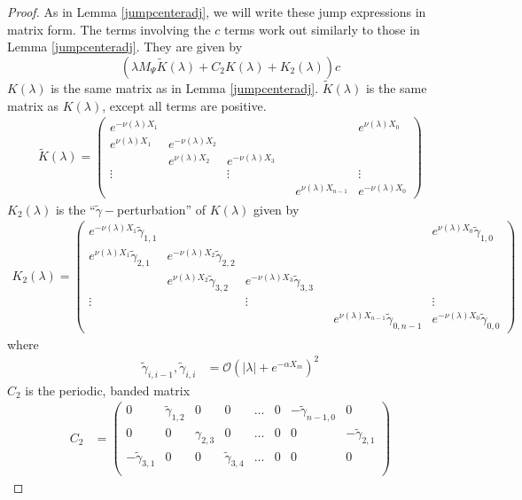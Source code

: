 \documentclass[thesis.tex]{subfiles}
\begin{document}
\begin{lemma}
\begin{proof}
As in Lemma \ref{jumpcenteradj}, we will write these jump expressions in matrix form. The terms involving the $c$ terms work out similarly to those in Lemma \ref{jumpcenteradj}. They are given by
\[
(\lambda M_\Psi \tilde{K}(\lambda) + C_2 K(\lambda) + K_2(\lambda))c
\]
$K(\lambda)$ is the same matrix as in Lemma \ref{jumpcenteradj}. $\tilde{K}(\lambda)$ is the same matrix as $K(\lambda)$, except all terms are positive.
\begin{align*}
\tilde{K}(\lambda) =  
\begin{pmatrix}
e^{-\nu(\lambda)X_1} & & & & & e^{\nu(\lambda)X_0} \\
e^{\nu(\lambda)X_1} & e^{-\nu(\lambda)X_2} \\
& e^{\nu(\lambda)X_2} & e^{-\nu(\lambda)X_3} \\
\vdots & & \vdots & &&  \vdots \\
& & & & e^{\nu(\lambda)X_{n-1}} & e^{-\nu(\lambda)X_0} 
\end{pmatrix}
\end{align*}
$K_2(\lambda)$ is the ``$\tilde{\gamma}-$perturbation'' of $K(\lambda)$ given by
\begin{align*}
K_2(\lambda) =  
\begin{pmatrix}
e^{-\nu(\lambda)X_1} \tilde{\gamma}_{1,1} & & & & & e^{\nu(\lambda)X_0}\tilde{\gamma}_{1,0} \\
e^{\nu(\lambda)X_1}\tilde{\gamma}_{2,1} & e^{-\nu(\lambda)X_2}\tilde{\gamma}_{2,2} \\
& e^{\nu(\lambda)X_2}\tilde{\gamma}_{3,2} & e^{-\nu(\lambda)X_3}\tilde{\gamma}_{3,3} \\
\vdots & & \vdots & &&  \vdots \\
& & & & e^{\nu(\lambda)X_{n-1}}\tilde{\gamma}_{0,n-1} & e^{-\nu(\lambda)X_0}\tilde{\gamma}_{0,0} 
\end{pmatrix}
\end{align*}
where 
\begin{align*}
\tilde{\gamma}_{i,i-1}, \tilde{\gamma}_{i,i} &= \mathcal{O}(|\lambda| + e^{-\alpha X_m})^2
\end{align*}
$C_2$ is the periodic, banded matrix
\begin{align*}
C_2 &= \begin{pmatrix}
0 & \tilde{\gamma}_{1,2} & 0 & 0 & \dots & 0 & -\tilde{\gamma}_{n-1,0} & 0 \\
0 & 0 & \gamma_{2,3} & 0 & \dots & 0 & 0 & -\tilde{\gamma}_{2,1} \\
-\tilde{\gamma}_{3,1} & 0 & 0 & \tilde{\gamma}_{3,4} & \dots & 0 & 0 & 0 \\

\end{pmatrix}
\end{align*}
\end{proof}
\end{lemma}
\end{document}
